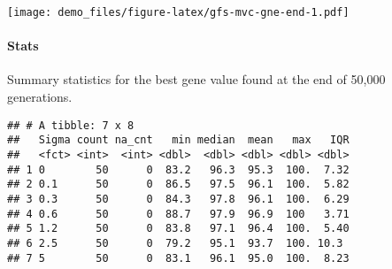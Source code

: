 \documentclass[]{book}
\newenvironment{Shaded}{\begin{snugshade}}{\end{snugshade}}
\newcommand{\DataTypeTok}[1]{\textcolor[rgb]{0.13,0.29,0.53}{#1}}
\newcommand{\FloatTok}[1]{\textcolor[rgb]{0.00,0.00,0.81}{#1}}
\newcommand{\KeywordTok}[1]{\textcolor[rgb]{0.13,0.29,0.53}{\textbf{#1}}}
\newcommand{\NormalTok}[1]{#1}
\newcommand{\OperatorTok}[1]{\textcolor[rgb]{0.81,0.36,0.00}{\textbf{#1}}}
\newcommand{\OtherTok}[1]{\textcolor[rgb]{0.56,0.35,0.01}{#1}}
\newcommand{\StringTok}[1]{\textcolor[rgb]{0.31,0.60,0.02}{#1}}
\let\oldparagraph\paragraph
\renewcommand{\paragraph}[1]{\oldparagraph{#1}\mbox{}}
\begin{document}
\texttt{[image: demo\_files/figure-latex/gfs-mvc-gne-end-1.pdf]}

\hypertarget{stats-52}{%
\paragraph{Stats}\label{stats-52}}

Summary statistics for the best gene value found at the end of 50,000 generations.

\begin{Shaded}
\end{Shaded}

\begin{verbatim}
## # A tibble: 7 x 8
##   Sigma count na_cnt   min median  mean   max   IQR
##   <fct> <int>  <int> <dbl>  <dbl> <dbl> <dbl> <dbl>
## 1 0        50      0  83.2   96.3  95.3  100.  7.32
## 2 0.1      50      0  86.5   97.5  96.1  100.  5.82
## 3 0.3      50      0  84.3   97.8  96.1  100.  6.29
## 4 0.6      50      0  88.7   97.9  96.9  100   3.71
## 5 1.2      50      0  83.8   97.1  96.4  100.  5.40
## 6 2.5      50      0  79.2   95.1  93.7  100. 10.3 
## 7 5        50      0  83.1   96.1  95.0  100.  8.23
\end{verbatim}
\end{document}
